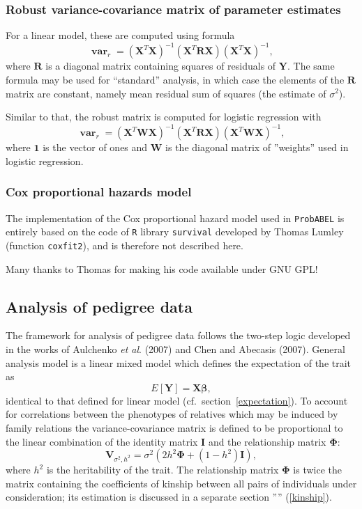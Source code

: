\documentclass[12pt,a4paper]{article}
\DeclareMathOperator{\var}{\mathbf{var}}
\begin{document}
\subsubsection{Robust variance-covariance matrix of parameter estimates}
For a linear model, these are computed using formula
$$
\var_r = (\mathbf{X}^T\mathbf{X})^{-1} (\mathbf{X}^T\mathbf{R}\mathbf{X})
(\mathbf{X}^T\mathbf{X})^{-1},
$$
where $\mathbf{R}$ is a diagonal matrix containing squares of residuals
of $\mathbf{Y}$. The
same formula may be used for ``standard'' analysis, in which case
the elements of the $\mathbf{R}$ matrix are constant, namely mean
residual sum of squares (the estimate of $\sigma^2$).

Similar to that, the robust matrix is computed for logistic regression with
$$
\var_r = (\mathbf{X}^T \mathbf{W} \mathbf{X})^{-1} (\mathbf{X}^T\mathbf{R}\mathbf{X})
(\mathbf{X}^T \mathbf{W} \mathbf{X})^{-1},
$$
where $\mathbf{1}$ is the vector of ones and $\mathbf{W}$ is the diagonal matrix
of ''weights'' used in logistic regression.


\subsubsection{Cox proportional hazards model}
The implementation of the Cox proportional hazard model used
in \texttt{ProbABEL} is entirely based on the code of \texttt{R}
library \texttt{survival} developed by Thomas Lumley
(function \texttt{coxfit2}), and is therefore not described here.

Many thanks to Thomas for making his code available under GNU GPL!

\subsection{Analysis of pedigree data}
The framework for analysis of pedigree data follows the two-step logic
developed in the works of Aulchenko \emph{et al}. (2007) and Chen and
Abecasis (2007). General analysis model is a linear mixed model which
defines the expectation of the trait as
$$
E[\mathbf{Y}] = \mathbf{X} \mathbf{\beta},
$$
identical to that defined for linear model (cf.~section~\ref{expectation}).
To account for correlations between the phenotypes of
relatives which may be induced by family relations the variance-covariance
matrix is defined to be proportional to the linear combination of the
identity matrix $\mathbf{I}$ and the relationship matrix $\mathbf{\Phi}$:
$$
\mathbf{V}_{\sigma^2,h^2} = \sigma^2 \left( 2 h^2 \mathbf{\Phi} + (1-h^2)
\mathbf{I} \right),
$$
where $h^2$ is the heritability of the trait.
The relationship matrix $\mathbf{\Phi}$ is twice the matrix containing
the coefficients of kinship between all pairs of individuals under consideration;
its estimation is discussed in a separate section '''' (\ref{kinship}).
\end{document}

